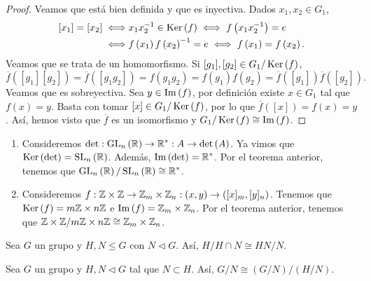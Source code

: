 \begin{proof}
	Veamos que está bien definida y que es inyectiva. Dados $\displaystyle x_{1}, x_{2} \in G_{1} $, 
	\[
	\begin{split}
		[x_{1}] = [x_{2}] \iff & x_{1}x_{2}^{-1} \in \operatorname{Ker}\left(f\right) \iff f\left(x_{1}x_{2}^{-1}\right) = e \\
		\iff & f\left(x_{1}\right)f\left(x_{2}\right)^{-1} = e \iff f\left(x_{1}\right) = f\left(x_{2}\right).
	\end{split}
	\]
	Veamos que se trata de un homomorfismo. Si $\displaystyle [g_{1}], [g_{2}] \in G_{1}/\operatorname{Ker}\left(f\right)	$,
	\[\overline{f}\left([g_{1}][g_{2}]\right) = \overline{f}\left([g_{1}g_{2}]\right) = f\left(g_{1}g_{2}\right) = f\left(g_{1}\right)f\left(g_{2}\right) = \overline{f}\left([g_{1}]\right)\overline{f}\left([g_{2}]\right) .\]
 Veamos que es sobreyectiva. Sea $\displaystyle y \in \operatorname{Im}\left(f\right) $, por definición existe $\displaystyle x \in G_{1} $ tal que $\displaystyle f\left(x\right) = y $. Basta con tomar $\displaystyle [x] \in G_{1}/\operatorname{Ker}\left(f\right) $, por lo que $\displaystyle \overline{f}\left([x]\right) = f\left(x\right) = y $. Así, hemos visto que $\displaystyle \overline{f} $ es un isomorfismo y $\displaystyle G_{1}/\operatorname{Ker}\left(f\right) \cong \operatorname{Im}\left(f\right) $.
\end{proof}
\begin{eg}
\begin{enumerate}
\item Consideremos $\displaystyle \det : \operatorname{GL}_{n}\left(\mathbb{R}\right) \to \mathbb{R}^{*} : A \to \det\left(A\right) $. Ya vimos que $\displaystyle \operatorname{Ker}\left(\det \right) = \operatorname{SL}_{n}\left(\mathbb{R}\right) $. Además, $\displaystyle \operatorname{Im}\left(\det \right) = \mathbb{R}^{*} $. Por el teorema anterior, tenemos que $\displaystyle \operatorname{GL}_{n}\left(\mathbb{R}\right)/\operatorname{SL}_{n}\left(\mathbb{R}\right) \cong \mathbb{R}^{*} $. 
\item Consideremos $\displaystyle f : \mathbb{Z} \times \mathbb{Z} \to \mathbb{Z}_{m} \times \mathbb{Z}_{n} : \left(x,y\right) \to \left([x]_{m}, [y]_{n}\right) $. Tenemos que $\displaystyle \operatorname{Ker}\left(f\right) = m\mathbb{Z} \times n\mathbb{Z} $ e $\displaystyle \operatorname{Im}\left(f\right) = \mathbb{Z}_{m} \times \mathbb{Z}_{n} $. Por el teorema anterior, tenemos que $\displaystyle \mathbb{Z} \times \mathbb{Z} / m\mathbb{Z} \times n\mathbb{Z} \cong \mathbb{Z}_{m} \times \mathbb{Z}_{n} $.
\end{enumerate}
\end{eg}
\begin{theorem}
Sea $\displaystyle G $ un grupo y $\displaystyle H,N \leq G $ con $\displaystyle N \lhd G $. Así, $\displaystyle H/H\cap N \cong HN/N $.
\end{theorem}
\begin{theorem}
Sea $\displaystyle G $ un grupo y $\displaystyle H,N \lhd G $ tal que $\displaystyle N \subset H $. Así, $\displaystyle G/N \cong \left(G/N\right) / \left(H/N\right) $. 
\end{theorem}

